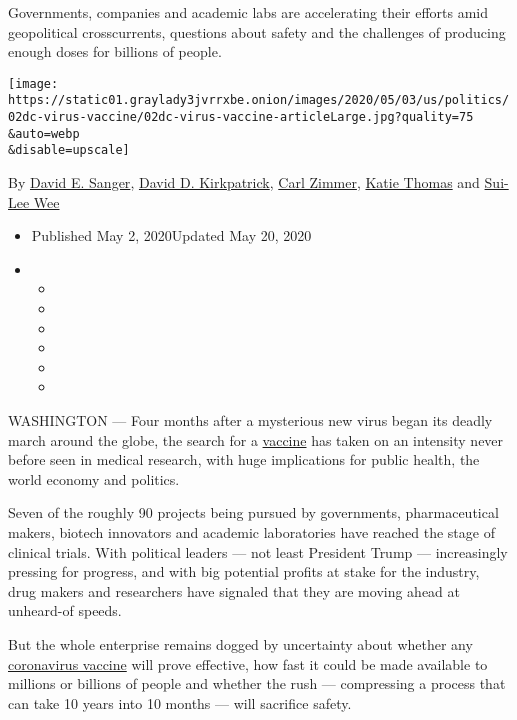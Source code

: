 Governments, companies and academic labs are accelerating their efforts
amid geopolitical crosscurrents, questions about safety and the
challenges of producing enough doses for billions of people.

\texttt{[image: https://static01.graylady3jvrrxbe.onion/images/2020/05/03/us/politics/02dc-virus-vaccine/02dc-virus-vaccine-articleLarge.jpg?quality=75\\\&auto=webp\\\&disable=upscale]}

By \href{https://www.nytimes3xbfgragh.onion/by/david-e-sanger}{David E.
Sanger},
\href{https://www.nytimes3xbfgragh.onion/by/david-d-kirkpatrick}{David
D. Kirkpatrick},
\href{https://www.nytimes3xbfgragh.onion/by/carl-zimmer}{Carl Zimmer},
\href{https://www.nytimes3xbfgragh.onion/by/katie-thomas}{Katie Thomas}
and \href{https://www.nytimes3xbfgragh.onion/by/sui-lee-wee}{Sui-Lee
Wee}

\begin{itemize}
\item
  Published May 2, 2020Updated May 20, 2020
\item
  \begin{itemize}
  \item
  \item
  \item
  \item
  \item
  \item
  \end{itemize}
\end{itemize}

WASHINGTON --- Four months after a mysterious new virus began its deadly
march around the globe, the search for a
\href{https://www.nytimes3xbfgragh.onion/2020/05/20/health/coronavirus-vaccines.html}{vaccine}
has taken on an intensity never before seen in medical research, with
huge implications for public health, the world economy and politics.

Seven of the roughly 90 projects being pursued by governments,
pharmaceutical makers, biotech innovators and academic laboratories have
reached the stage of clinical trials. With political leaders --- not
least President Trump --- increasingly pressing for progress, and with
big potential profits at stake for the industry, drug makers and
researchers have signaled that they are moving ahead at unheard-of
speeds.

But the whole enterprise remains dogged by uncertainty about whether any
\href{https://www.nytimes3xbfgragh.onion/2020/05/20/health/coronavirus-vaccines.html}{coronavirus
vaccine} will prove effective, how fast it could be made available to
millions or billions of people and whether the rush --- compressing a
process that can take 10 years into 10 months --- will sacrifice safety.

